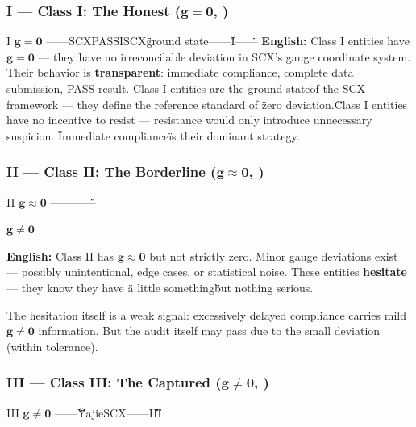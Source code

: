 \documentclass[12pt,a4paper]{article}
\theoremstyle{remark}
\newcommand{\g}{\mathbf{g}}
\begin{document}
\subsubsection{I — Class I: The Honest ($ \g = \mathbf{0} $, )}

\noindent
\textbf{} I $ \g = \mathbf{0} $ ——SCX\textbf{}PASSISCX\"\"ground state——\"\"

I——\"\"

\vspace{4pt}
\noindent
\textbf{English:} Class I entities have $ \g = \mathbf{0} $ — they have no irreconcilable deviation in SCX's gauge coordinate system. Their behavior is \textbf{transparent}: immediate compliance, complete data submission, PASS result. Class I entities are the \"ground state\" of the SCX framework — they define the reference standard of \"zero deviation.\"

Class I entities have no incentive to resist — resistance would only introduce unnecessary suspicion. \"Immediate compliance\" is their dominant strategy.

\subsubsection{II — Class II: The Borderline ($ \g \approx \mathbf{0} $, )}

\noindent
\textbf{} II $ \g \approx \mathbf{0} $ ——\textbf{}——\"\"

 $ \g \neq \mathbf{0} $ 

\vspace{4pt}
\noindent
\textbf{English:} Class II has $ \g \approx \mathbf{0} $ but not strictly zero. Minor gauge deviations exist — possibly unintentional, edge cases, or statistical noise. These entities \textbf{hesitate} — they know they have \"a little something\" but nothing serious.

The hesitation itself is a weak signal: excessively delayed compliance carries mild $ \g \neq \mathbf{0} $ information. But the audit itself may pass due to the small deviation (within tolerance).

\subsubsection{III — Class III: The Captured ($ \g \neq \mathbf{0} $, )}

\noindent
\textbf{} III $ \g \neq \mathbf{0} $ ——\"\"\"\"

YajieSCX——III\textbf{\"\"}
\end{document}
